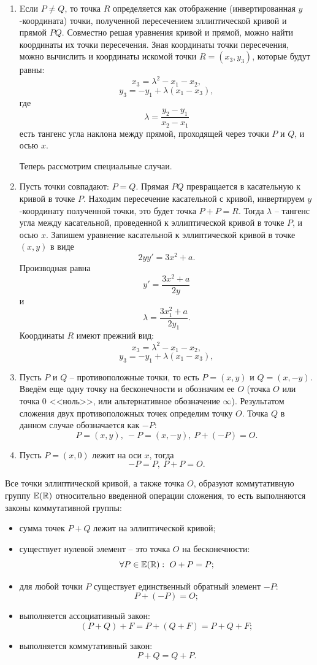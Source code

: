 \begin{enumerate}
    \item Eсли $P \neq Q$, то точка $R$ определяется как отображение (инвертированная $y$-координата) точки, полученной пересечением эллиптической кривой и прямой $PQ$. Совместно решая уравнения кривой и прямой, можно найти координаты их точки пересечения. Зная координаты точки пересечения, можно вычислить и координаты искомой точки $R = (x_3, y_3)$, которые будут равны:
        \[ x_3 = \lambda^2 - x_1 - x_2, \]
        \[ y_3 = - y_1 + \lambda (x_1 - x_3), \]
где
        \[ \lambda = \frac{y_2 - y_1}{x_2 - x_1} \]
есть тангенс угла наклона между прямой, проходящей через точки $P$ и $Q$, и осью $x$.

	Теперь рассмотрим специальные случаи.
    \item Пусть точки совпадают: $P = Q$. Прямая $PQ$ превращается в касательную к кривой в точке $P$. Находим пересечение касательной с кривой, инвертируем $y$-координату полученной точки, это будет точка $P + P = R$. Тогда $\lambda$ -- тангенс угла между касательной, проведенной к эллиптической кривой в точке $P$, и осью $x$. Запишем уравнение касательной к эллиптической кривой в точке $(x,y)$ в виде
            \[ 2 y y' = 3 x^2 + a. \]
        Производная равна
            \[ y' = \frac{3 x^2 + a}{2 y} \]
        и
            \[ \lambda = \frac{3 x_1^2 + a}{2 y_1}. \]
        Координаты $R$ имеют прежний вид:
            \[ x_3 = \lambda^2 - x_1 - x_2, \]
            \[ y_3 = - y_1 + \lambda (x_1 - x_3), \]
    \item Пусть $P$ и $Q$ -- противоположные точки, то есть $P=(x,y)$ и $Q=(x, -y)$. Введём еще одну точку на бесконечности и обозначим ее $O$ (точка $O$ или точка 0 <<ноль>>, или альтернативное обозначение $\infty$). Результатом сложения двух противоположных точек определим точку $O$. Точка $Q$ в данном случае обозначается как $-P$:
        \[ P = (x,y), ~ -P = (x, -y), ~ P + (-P) = O. \]
    \item Пусть $P = (x, 0)$ лежит на оси $x$, тогда
        \[ -P = P, ~ P + P = O. \]
\end{enumerate}

Все точки эллиптической кривой, а также точка $O$, образуют коммутативную группу $\mathbb{E}(\mathbb{R})$ относительно введенной операции сложения, то есть выполняются законы коммутативной группы:
\begin{itemize}
    \item сумма точек $P + Q$ лежит на эллиптической кривой;
    \item существует нулевой элемент -- это точка $O$ на бесконечности:
        \[ \forall P \in \mathbb{E}(\mathbb{R}): ~ O + P = P; \]
    \item для любой точки $P$ существует единственный обратный элемент $-P$:
        \[ P + (-P) = O; \]
    \item выполняется ассоциативный закон:
        \[ (P + Q) + F = P + (Q + F) = P + Q + F; \]
    \item выполняется коммутативный закон:
        \[ P + Q = Q + P. \]
\end{itemize}

